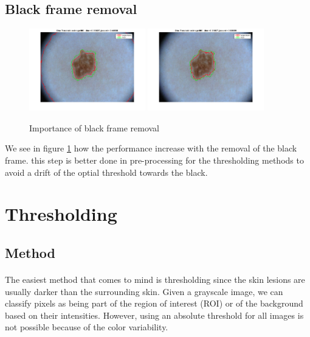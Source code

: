 \documentclass[a4paper,10pt]{article}
\begin{document}
\subsection{Black frame removal}

\begin{figure}
	\centering
	\includegraphics[width=0.45\textwidth]{../results/blackframe/otsu_006_blackframe.png} 
	\includegraphics[width=0.45\textwidth]{../results/blackframe/otsu-segt-im-006.png} 
	\label{fig:blackframe}
	\caption{Importance of black frame removal}
\end{figure}

We see in figure \ref{fig:blackframe} how the performance increase with the removal of the black frame. this step is better done in pre-processing for the thresholding methods to avoid a drift of the optial threshold towards the black.

\section{Thresholding}
\subsection{Method}
\paragraph{}
The easiest method that comes to mind is thresholding since the skin lesions are 
usually darker than the surrounding skin. Given a grayscale image, we can 
classify pixels as being part of the region of interest (ROI) or of the 
background based on their intensities. However, using an absolute threshold for all images is not possible because of the color variability. 
\end{document}
